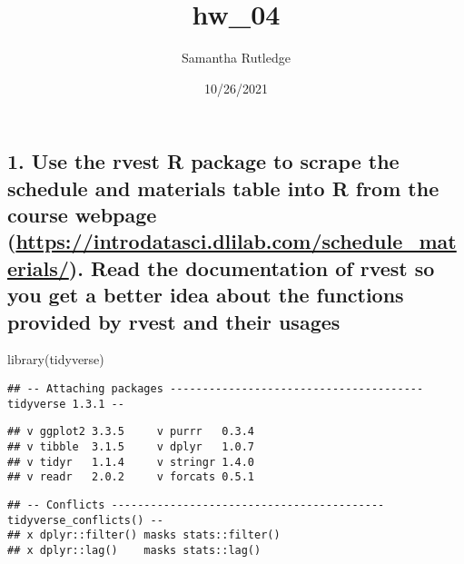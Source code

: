 \documentclass[
]{article}
\title{hw\_04}
\author{Samantha Rutledge}
\date{10/26/2021}
\newenvironment{Shaded}{\begin{snugshade}}{\end{snugshade}}
\newcommand{\FunctionTok}[1]{\textcolor[rgb]{0.00,0.00,0.00}{#1}}
\newcommand{\NormalTok}[1]{#1}
\begin{document}
\maketitle

\hypertarget{use-the-rvest-r-package-to-scrape-the-schedule-and-materials-table-into-r-from-the-course-webpage-httpsintrodatasci.dlilab.comschedule_materials.-read-the-documentation-of-rvest-so-you-get-a-better-idea-about-the-functions-provided-by-rvest-and-their-usages}{%
\subsection{\texorpdfstring{1. Use the rvest R package to scrape the
schedule and materials table into R from the course webpage
(\url{https://introdatasci.dlilab.com/schedule_materials/}). Read the
documentation of rvest so you get a better idea about the functions
provided by rvest and their
usages}{1. Use the rvest R package to scrape the schedule and materials table into R from the course webpage (https://introdatasci.dlilab.com/schedule\_materials/). Read the documentation of rvest so you get a better idea about the functions provided by rvest and their usages}}\label{use-the-rvest-r-package-to-scrape-the-schedule-and-materials-table-into-r-from-the-course-webpage-httpsintrodatasci.dlilab.comschedule_materials.-read-the-documentation-of-rvest-so-you-get-a-better-idea-about-the-functions-provided-by-rvest-and-their-usages}}

\begin{Shaded}
\begin{Highlighting}[]
\FunctionTok{library}\NormalTok{(tidyverse)}
\end{Highlighting}
\end{Shaded}

\begin{verbatim}
## -- Attaching packages --------------------------------------- tidyverse 1.3.1 --
\end{verbatim}

\begin{verbatim}
## v ggplot2 3.3.5     v purrr   0.3.4
## v tibble  3.1.5     v dplyr   1.0.7
## v tidyr   1.1.4     v stringr 1.4.0
## v readr   2.0.2     v forcats 0.5.1
\end{verbatim}

\begin{verbatim}
## -- Conflicts ------------------------------------------ tidyverse_conflicts() --
## x dplyr::filter() masks stats::filter()
## x dplyr::lag()    masks stats::lag()
\end{verbatim}
\end{document}
